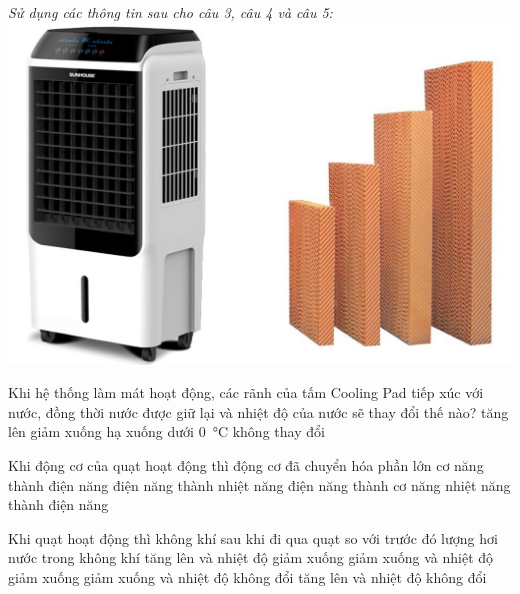 \textit{Sử dụng các thông tin sau cho câu 3, câu 4 và câu 5:}
{\includegraphics[scale=0.2]{../figs/FINAL-SEM1-005-5}}
\begin{ex}
Khi hệ thống làm mát hoạt động, các rãnh của tấm Cooling Pad tiếp xúc với nước, đồng thời nước được giữ lại và nhiệt độ của nước sẽ thay đổi thế nào?	
	\choice
	{tăng lên}
	{\True giảm xuống}
	{hạ xuống dưới \SI{0}{\celsius}}
	{không thay đổi}
	\loigiai{}
\end{ex}
\begin{ex}
	Khi động cơ của quạt hoạt động thì động cơ đã chuyển hóa phần lớn
	\choice
	{cơ năng thành điện năng}
	{điện năng thành nhiệt năng}
	{\True điện năng thành cơ năng}
	{nhiệt năng thành điện năng}
	\loigiai{}
\end{ex}
\begin{ex}
	Khi quạt hoạt động thì không khí sau khi đi qua quạt so với trước đó lượng hơi nước trong không khí
	\choice
	{\True tăng lên và nhiệt độ giảm xuống}
	{giảm xuống và nhiệt độ giảm xuống}
	{giảm xuống và nhiệt độ không đổi}
	{tăng lên và nhiệt độ không đổi}
	\loigiai{}
\end{ex}
